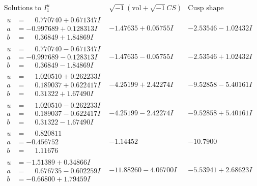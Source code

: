 \documentclass[1p]{elsarticle_modified}
\theoremstyle{definition}
\newcommand{\I}{\sqrt{-1}}
\begin{document}
$$\begin{array}{c|c|c}  
\text{Solutions to }I^u_{1}& \I (\text{vol} + \sqrt{-1}CS) & \text{Cusp shape}\\
 \hline 
\begin{aligned}
u &= \phantom{-}0.770740 + 0.671347 I \\
a &= -0.997689 + 0.128313 I \\
b &= \phantom{-}0.36849 + 1.84869 I\end{aligned}
 & -1.47635 + 0.05755 I & -2.53546 - 1.02432 I \\ \hline\begin{aligned}
u &= \phantom{-}0.770740 - 0.671347 I \\
a &= -0.997689 - 0.128313 I \\
b &= \phantom{-}0.36849 - 1.84869 I\end{aligned}
 & -1.47635 - 0.05755 I & -2.53546 + 1.02432 I \\ \hline\begin{aligned}
u &= \phantom{-}1.020510 + 0.262233 I \\
a &= \phantom{-}0.189037 + 0.622417 I \\
b &= \phantom{-}0.31322 + 1.67490 I\end{aligned}
 & -4.25199 + 2.42274 I & -9.52858 - 5.40161 I \\ \hline\begin{aligned}
u &= \phantom{-}1.020510 - 0.262233 I \\
a &= \phantom{-}0.189037 - 0.622417 I \\
b &= \phantom{-}0.31322 - 1.67490 I\end{aligned}
 & -4.25199 - 2.42274 I & -9.52858 + 5.40161 I \\ \hline\begin{aligned}
u &= \phantom{-}0.820811\phantom{ +0.000000I} \\
a &= -0.456752\phantom{ +0.000000I} \\
b &= \phantom{-}1.11676\phantom{ +0.000000I}\end{aligned}
 & -1.14452\phantom{ +0.000000I} & -10.7900\phantom{ +0.000000I} \\ \hline\begin{aligned}
u &= -1.51389 + 0.34866 I \\
a &= \phantom{-}0.676735 - 0.602259 I \\
b &= -0.66800 + 1.79459 I\end{aligned}
 & -11.88260 - 4.06700 I & -5.53941 + 2.68623 I \\ \hline\begin{aligned}

\end{aligned}
\end{array}$$
\end{document}
